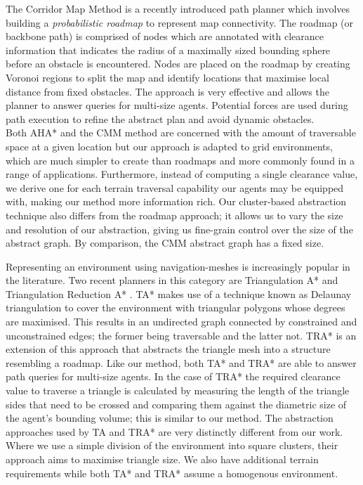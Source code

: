 \par
\indent The Corridor Map Method \cite{geraerts07} is a recently introduced path planner which involves building a \emph{probabilistic roadmap} to represent map connectivity. 
The roadmap (or backbone path) is comprised of nodes which are annotated with clearance information that indicates the radius of a maximally sized bounding sphere before an obstacle is encountered. 
Nodes are placed on the roadmap by creating Voronoi regions to split the map and identify locations that maximise local distance from fixed obstacles. 
The approach is very effective and allows the planner to answer queries for multi-size agents. 
Potential forces are used during path execution to refine the abstract plan and avoid dynamic obstacles. \\
Both AHA* and the CMM method are concerned with the amount of traversable space at a given location but our approach is adapted to grid environments, which are much simpler to create than roadmaps and more commonly found in a range of applications. 
Furthermore, instead of computing a single clearance value, we derive one for each terrain traversal capability our agents may be equipped with, making our method more information rich. 
Our cluster-based abstraction technique also differs from the roadmap approach; it allows us to vary the size and resolution of our abstraction, giving us fine-grain control over the size of the abstract graph. 
By comparison, the CMM abstract graph has a fixed size.
\par 
\indent Representing an environment using navigation-meshes is increasingly popular in the literature. 
Two recent planners in this category are Triangulation A* and Triangulation Reduction A* \cite{demyen07}. 
TA* makes use of a technique known as Delaunay triangulation to cover the environment with triangular polygons whose degrees are maximised. 
This results in an undirected graph connected by constrained and unconstrained edges; the former being traversable and the latter not. 
TRA* is an extension of this approach that abstracts the triangle mesh into a structure resembling a roadmap. 
Like our method, both TA* and TRA* are able to answer path queries for multi-size agents. 
In the case of TRA* the required clearance value to traverse a triangle is calculated by measuring the length of the triangle sides that need to be crossed and comparing them against the diametric size of the agent's bounding volume; this is similar to our method. 
The abstraction approaches used by TA and TRA* are very distinctly different from our work. 
Where we use a simple division of the environment into square clusters, their approach aims to maximise triangle size. 
We also have additional terrain requirements while both TA* and TRA* assume a homogenous environment.

